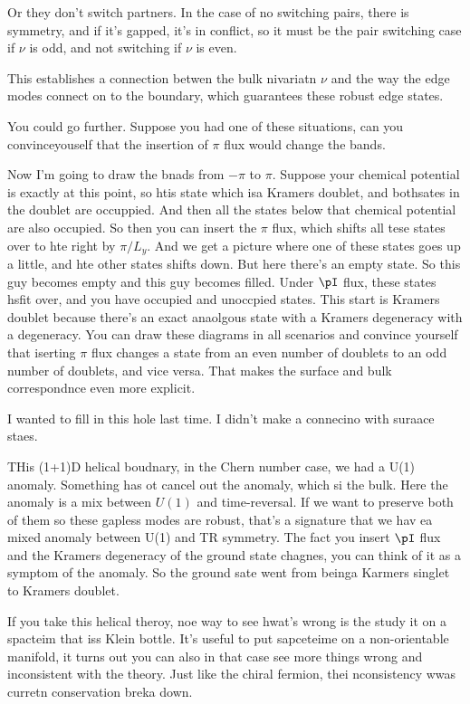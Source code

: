 Or they don't switch partners.
In the case of no switching pairs,
there is symmetry,
and if it's gapped, it's in conflict,
so it must be the pair switching case if $\nu$ is odd,
and not switching if $\nu$ is even.

This establishes a connection betwen the bulk nivariatn $\nu$ and the way the
edge modes connect on to the boundary,
which guarantees these robust edge states.

You could go further.
Suppose you had one of these situations,
can you convinceyouself that the insertion of $\pi$ flux would change the bands.

Now I'm going to draw the bnads from $-\pi$ to $\pi$.
Suppose your chemical potential is exactly at this point,
so htis state which isa Kramers doublet,
and bothsates in the doublet are occuppied.
And then all the states below that chemical potential are also occupied.
So then you can insert the $\pi$ flux,
which shifts all tese states over to hte right by $\pi/L_y$.
And we get a picture where one of these states goes up a little,
and hte other states shifts down.
But here there's an empty state.
So this guy becomes empty and this guy becomes filled.
Under $\pI$ flux,
these states hsfit over,
and you have occupied and unoccpied states.
This start is Kramers doublet because there's an exact anaolgous state with a
Kramers degeneracy with a degeneracy.
You can draw these diagrams in all scenarios and convince yourself that iserting
$\pi$ flux changes a state from an even number of doublets to an odd number of
doublets, and vice versa.
That makes the surface and bulk correspondnce even more explicit.

I wanted to fill in this hole last time.
I didn't make a connecino with suraace staes.

THis (1+1)D helical boudnary,
in the Chern number case,
we had a U(1) anomaly.
Something has ot cancel out the anomaly,
which si the bulk.
Here the anomaly is a mix between $U(1)$ and time-reversal.
If we want to preserve both of them so these gapless modes are robust,
that's a signature that we hav ea mixed anomaly between U(1) and TR symmetry.
The fact you insert $\pI$ flux and the Kramers degeneracy of the ground state
chagnes,
you can think of it as a symptom of the anomaly.
So the ground sate went from beinga Karmers singlet to Kramers doublet.

If you take this helical theroy,
noe way to see hwat's wrong is the study it on a spacteim that iss Klein bottle.
It's useful to put sapceteime on a non-orientable manifold,
it turns out you can also in that case see more things wrong and inconsistent
with the theory.
Just like the chiral fermion, thei nconsistency wwas curretn conservation breka
down.

